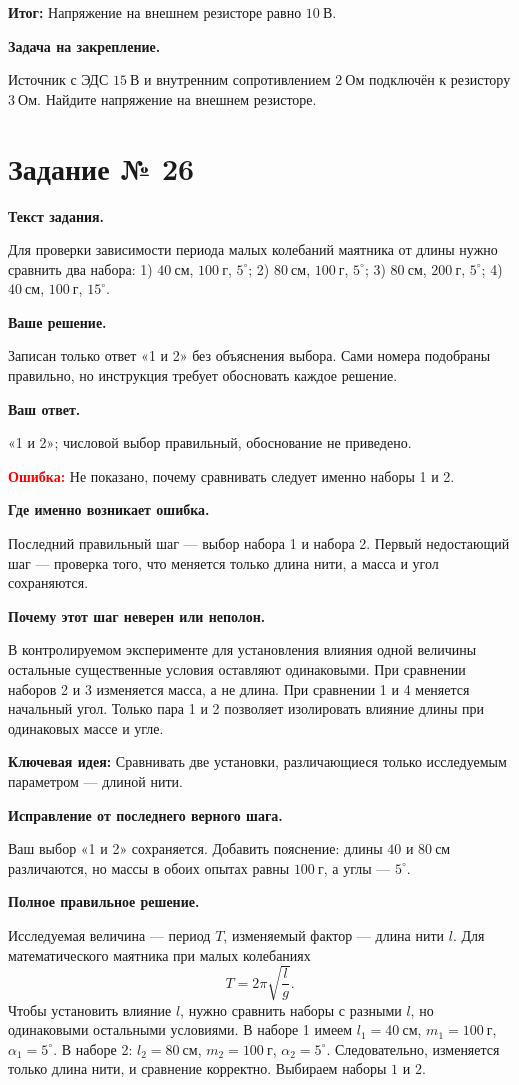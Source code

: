\documentclass[11pt,a4paper]{article}
\newcommand{\reviewblock}[2]{\par\medskip\noindent\textbf{#1}\par\noindent#2\par}
\newcommand{\errorblock}[1]{\par\medskip\noindent\textcolor{red}{\textbf{Ошибка:}} #1\par}
\newcommand{\ideablock}[1]{\par\medskip\noindent\textcolor{blue!60!black}{\textbf{Ключевая идея:}} #1\par}
\newcommand{\resultblock}[1]{\par\medskip\noindent\textcolor{teal!60!black}{\textbf{Итог:}} #1\par}
\begin{document}
\resultblock{Напряжение на внешнем резисторе равно $10\ \text{В}$.}

\reviewblock{Задача на закрепление.}{Источник с ЭДС $15\ \text{В}$ и внутренним сопротивлением $2\ \text{Ом}$ подключён к резистору $3\ \text{Ом}$. Найдите напряжение на внешнем резисторе.}
\newpage
{}\label{task:26}

\section*{Задание № 26}

\reviewblock{Текст задания.}{Для проверки зависимости периода малых колебаний маятника от длины нужно сравнить два набора: 1) $40\ \text{см}$, $100\ \text{г}$, $5^\circ$; 2) $80\ \text{см}$, $100\ \text{г}$, $5^\circ$; 3) $80\ \text{см}$, $200\ \text{г}$, $5^\circ$; 4) $40\ \text{см}$, $100\ \text{г}$, $15^\circ$.}

\reviewblock{Ваше решение.}{Записан только ответ «1 и 2» без объяснения выбора. Сами номера подобраны правильно, но инструкция требует обосновать каждое решение.}

\reviewblock{Ваш ответ.}{«1 и 2»; числовой выбор правильный, обоснование не приведено.}

\errorblock{Не показано, почему сравнивать следует именно наборы 1 и 2.}

\reviewblock{Где именно возникает ошибка.}{Последний правильный шаг --- выбор набора 1 и набора 2. Первый недостающий шаг --- проверка того, что меняется только длина нити, а масса и угол сохраняются.}

\reviewblock{Почему этот шаг неверен или неполон.}{В контролируемом эксперименте для установления влияния одной величины остальные существенные условия оставляют одинаковыми. При сравнении наборов 2 и 3 изменяется масса, а не длина. При сравнении 1 и 4 меняется начальный угол. Только пара 1 и 2 позволяет изолировать влияние длины при одинаковых массе и угле.}

\ideablock{Сравнивать две установки, различающиеся только исследуемым параметром --- длиной нити.}

\reviewblock{Исправление от последнего верного шага.}{Ваш выбор «1 и 2» сохраняется. Добавить пояснение: длины $40$ и $80\ \text{см}$ различаются, но массы в обоих опытах равны $100\ \text{г}$, а углы --- $5^\circ$.}

\reviewblock{Полное правильное решение.}{Исследуемая величина --- период $T$, изменяемый фактор --- длина нити $l$. Для математического маятника при малых колебаниях
\[T=2\pi\sqrt{\frac{l}{g}}.\]
Чтобы установить влияние $l$, нужно сравнить наборы с разными $l$, но одинаковыми остальными условиями. В наборе 1 имеем $l_1=40\ \text{см}$, $m_1=100\ \text{г}$, $\alpha_1=5^\circ$. В наборе 2: $l_2=80\ \text{см}$, $m_2=100\ \text{г}$, $\alpha_2=5^\circ$. Следовательно, изменяется только длина нити, и сравнение корректно. Выбираем наборы $1$ и $2$.}
\end{document}
